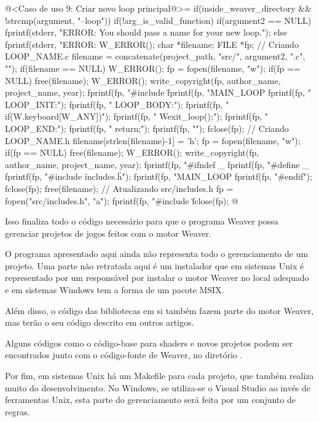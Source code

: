 {\iniciocodigo
@<Caso de uso 9: Criar novo loop principal@>=
if(inside_weaver_directory && !strcmp(argument, "--loop")){
  if(!arg_is_valid_function){
    if(argument2 == NULL)
      fprintf(stderr,
              "ERROR: You should pass a name for your new loop.\n");
    else
      fprintf(stderr, "ERROR: %
    W_ERROR();
  }
  char *filename;
  FILE *fp;
  // Criando LOOP_NAME.c
  filename = concatenate(project_path, "src/", argument2, ".c", "");
  if(filename == NULL) W_ERROR();
  fp = fopen(filename, "w");
  if(fp == NULL){
    free(filename);
    W_ERROR();
  }
  write_copyright(fp, author_name, project_name, year);
  fprintf(fp, "#include \"%
  fprintf(fp, "MAIN_LOOP %
  fprintf(fp, " LOOP_INIT:\n\n");
  fprintf(fp, " LOOP_BODY:\n");
  fprintf(fp, "  if(W.keyboard[W_ANY])\n");
  fprintf(fp, "    Wexit_loop();\n");
  fprintf(fp, " LOOP_END:\n");
  fprintf(fp, "  return;\n");
  fprintf(fp, "}\n");
  fclose(fp);
  // Criando LOOP_NAME.h
  filename[strlen(filename)-1] = 'h';
  fp = fopen(filename, "w");
  if(fp == NULL){
    free(filename);
    W_ERROR();
  }
  write_copyright(fp, author_name, project_name, year);
  fprintf(fp, "#ifndef _%
  fprintf(fp, "#define _%
  fprintf(fp, "#include \"includes.h\"\n\n");
  fprintf(fp, "MAIN_LOOP %
  fprintf(fp, "#endif\n");
  fclose(fp);
  free(filename);
  // Atualizando src/includes.h
  fp = fopen("src/includes.h", "a");
  fprintf(fp, "#include \"%
  fclose(fp);  
}
@
\fimcodigo


Isso finaliza todo o código necessário para que o programa Weaver
possa gerenciar projetos de jogos feitos com o motor Weaver.

O programa apresentado aqui ainda não representa todo o gerenciamento
de um projeto. Uma parte não retratada aqui é um instalador que em
sistemas Unix é representado por um  responsável
por instalar o motor Weaver no local adequado e em sistemas Windows
tem a forma de um pacote MSIX.

Além disso, o código das bibliotecas em si também fazem parte do motor
Weaver, mas terão o seu código descrito em outros artigos.

Alguns códigos como o código-base para shaders e novos projetos podem
ser encontrados junto com o código-fonte de Weaver, no
diretório .

Por fim, em sistemas Unix há um Makefile para cada projeto, que também
realiza muito do desenvolvimento. No Windows, se utiliza-se o Visual
Studio ao invés de ferramentas Unix, esta parte do gerenciamento será
feita por um conjunto de regras.

\fim
